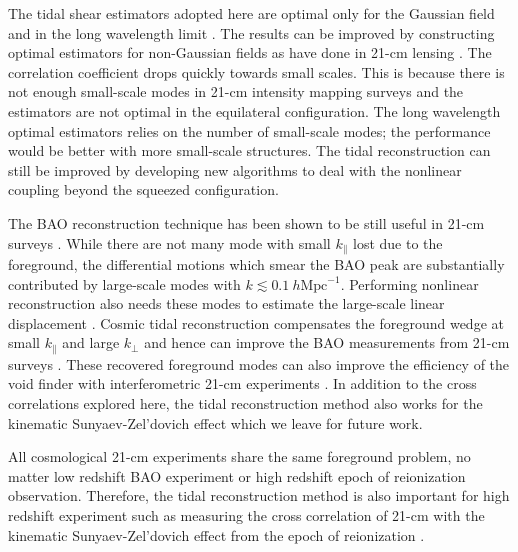 \documentclass[prd,superscriptaddress,floatfix,notitlepage,nofootinbib,reprint]{revtex4-1}
\newcommand{\mr}{\mathrm}
\newcommand{\kpa}{k_\parallel}
\newcommand{\kpe}{k_\perp}
\begin{document}
The tidal shear estimators adopted here are optimal only for the Gaussian field
and in the long wavelength limit \cite{2016Tides,2008LensingEst,2012LensingEst}.
The results can be improved by constructing optimal estimators for non-Gaussian 
fields as have done in 21-cm lensing \cite{2010LensingEst}.
The correlation coefficient drops quickly towards small scales.
This is because there is not enough small-scale modes in 21-cm intensity mapping
surveys and the estimators are not optimal in the equilateral configuration.
The long wavelength optimal estimators relies on the number of small-scale
modes; the performance would be better with more small-scale structures. 
The tidal reconstruction can still be improved by developing new algorithms to
deal with the nonlinear coupling beyond the squeezed configuration.

The BAO reconstruction technique has been shown to be still useful in 21-cm 
surveys \cite{2016BAO,2016Combine,2017BAO}.
While there are not many mode with small $\kpa$ lost due to the foreground, the
differential motions which smear the BAO peak are substantially contributed by 
large-scale modes with $k\lesssim0.1\ h\mr{Mpc}^{-1}$.
Performing nonlinear reconstruction also needs these modes to estimate the 
large-scale linear displacement \cite{2017NR2,2016NR,2017NR}.
Cosmic tidal reconstruction compensates the foreground wedge at small $\kpa$
and large $\kpe$ and hence can improve the BAO measurements from 21-cm surveys 
\cite{2016BAO,2016Combine}. 
These recovered foreground modes can also improve the efficiency of the void 
finder with interferometric 21-cm experiments \cite{2017Void}.
In addition to the cross correlations explored here, the tidal reconstruction 
method also works for the kinematic Sunyaev-Zel'dovich effect which we leave 
for future work.

All cosmological 21-cm experiments share the same foreground problem, no matter
low redshift BAO experiment or high redshift epoch of reionization observation.
Therefore, the tidal reconstruction method is also important for high redshift 
experiment such as measuring the cross correlation of 21-cm with the kinematic
Sunyaev-Zel'dovich effect from the epoch of reionization \cite{2016kSZ}.
\end{document}
